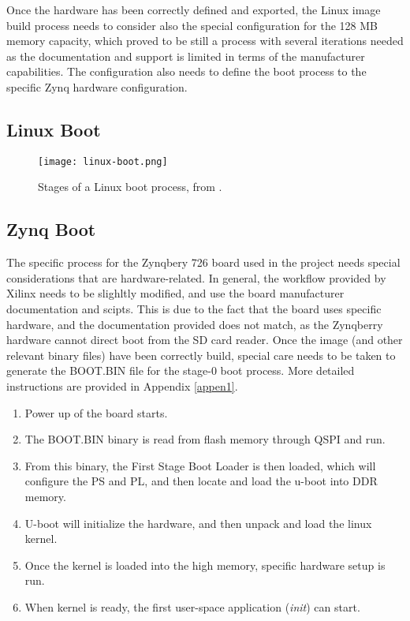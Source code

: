 Once the hardware has been correctly defined and exported, the Linux image build process needs to
consider also the special configuration for the 128 MB memory capacity, which proved to be still a
process with several iterations needed as the documentation and support is limited in terms of the
manufacturer capabilities. The configuration also needs to define the boot process to the specific
Zynq hardware configuration.

\subsection{Linux Boot}

\begin{figure}[htp]
	\centering
	\texttt{[image: linux-boot.png]}
	\caption{Stages of a Linux boot process, from \cite{Crokett2014}.} \label{fig:linux-boot}
\end{figure}

\subsection{Zynq Boot}

The specific process for the Zynqbery 726 board used in the project needs special considerations
that are hardware-related. In general, the workflow provided by Xilinx needs to be slighltly
modified, and use the board manufacturer documentation and scipts. This is due to the fact that the
board uses specific hardware, and the documentation provided does not match, as the Zynqberry
hardware cannot direct boot from the SD card reader. Once the image (and other relevant binary
files) have been correctly build, special care needs to be taken to generate the BOOT.BIN file for
the stage-0 boot process. More detailed instructions are provided in Appendix \ref{appen1}.

\begin{enumerate}
	\item Power up of the board starts.
	\item The BOOT.BIN binary is read from flash memory through QSPI and run.
	\item From this binary, the First Stage Boot Loader is then loaded, which will configure the PS
	and PL, and then locate and load the u-boot into DDR memory.
	\item U-boot will initialize the hardware, and then unpack and load the linux kernel.
	\item Once the kernel is loaded into the high memory, specific hardware setup is run.
	\item When kernel is ready, the first user-space application (\textit{init}) can start.
\end{enumerate}

